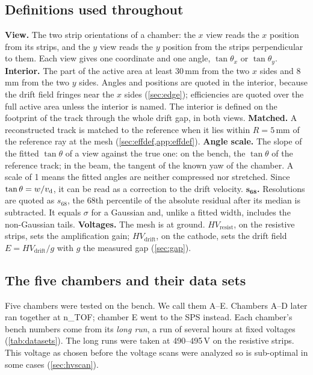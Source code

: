 \subsection{Definitions used throughout}\label{sec:definitions}
\textbf{View.} The two strip orientations of a chamber: the $x$ view reads the $x$ position from its strips, and the $y$ view reads the $y$
position from the strips perpendicular to them. Each view gives one coordinate and one angle, $\tan\theta_x$ or $\tan\theta_y$.
\textbf{Interior.} The part of the active area at least 30\,mm from the two $x$ sides and 8\,mm from the two $y$
sides. Angles and positions are quoted in the interior, because the drift field fringes near the $x$ sides
(\cref{sec:edge}); efficiencies are quoted over the full active area unless the interior is named.
The interior is defined on the footprint of the track through the whole drift gap, in both views.
\textbf{Matched.} A reconstructed track is matched to the reference when it lies within $R=5$\,mm of the reference ray
at the mesh (\cref{sec:effdef,app:effdef}).
\textbf{Angle scale.} The slope of the fitted $\tan\theta$ of a view against the true one: on the bench, the
$\tan\theta$ of the reference track; in the beam, the tangent of the known yaw of the chamber. A scale of 1 means the
fitted angles are neither compressed nor stretched. Since $\tan\theta=w/v_\mathrm{d}$, it can be read as a correction to the drift velocity.
\textbf{$\boldsymbol{s_{68}}$.} Resolutions are quoted as $s_{68}$, the 68th percentile of the absolute residual after its median is subtracted. It equals $\sigma$ for a Gaussian and, unlike a fitted width, includes the non-Gaussian tails.
\textbf{Voltages.} The mesh is at ground. $HV_\mathrm{resist}$, on the resistive strips, sets the amplification gain;
$HV_\mathrm{drift}$, on the cathode, sets the drift field $E=HV_\mathrm{drift}/g$ with $g$ the measured gap
(\cref{sec:gap}).

\subsection{The five chambers and their data sets}\label{sec:datasets}
Five chambers were tested on the bench. We call them A--E. Chambers A--D later ran together at n\_TOF; chamber E
went to the SPS instead. Each chamber's bench numbers come from its \emph{long run}, a run of several hours at fixed
voltages (\cref{tab:datasets}). The long runs were taken at 490--495\,V on the resistive strips. This voltage as chosen before the voltage
scans were analyzed so is sub-optimal in some cases (\cref{sec:hvscan}).

